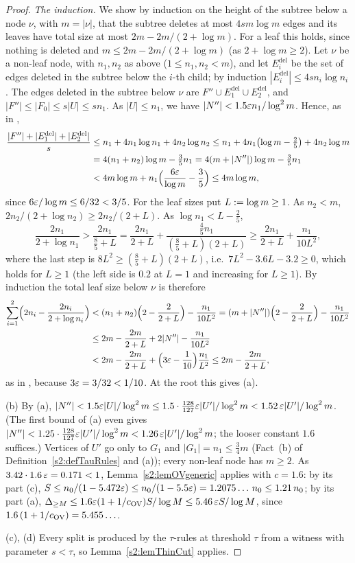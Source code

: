 \begin{proof}
\emph{The induction.} We show by induction on the height of the subtree below
a node $\nu$, with $m=|\nu|$, that the subtree deletes at most $4sm\log m$ edges
and its leaves have total size at most $2m-2m/(2+\log m)$. For a leaf this
holds, since nothing is deleted and $m\le2m-2m/(2+\log m)$ (as
$2+\log m\ge2$). Let $\nu$ be a non-leaf node, with $n_1,n_2$ as above
($1\le n_1,n_2<m$), and let $E^{\mathrm{del}}_i$ be the set of edges deleted in the subtree
below the $i$-th child; by induction $|E^{\mathrm{del}}_i|\le4sn_i\log n_i$. The edges
deleted in the subtree below $\nu$ are $F''\cup E^{\mathrm{del}}_1\cup E^{\mathrm{del}}_2$, and $|F''|\le
|F_0|\le s|U|\le sn_1$. As $|U|\le n_1$, we have $|N''|<1.5\varepsilon n_1/\log^2m$.
Hence, as in \cite[inequality~(8)]{BM},
\begin{align*}
\frac{|F''|+|E^{\mathrm{del}}_1|+|E^{\mathrm{del}}_2|}{s}
&\le n_1+4n_1\log n_1+4n_2\log n_2
\le n_1+4n_1\bigl(\log m-\tfrac25\bigr)+4n_2\log m\\
&=4(n_1+n_2)\log m-\tfrac35n_1=4(m+|N''|)\log m-\tfrac35n_1\\
&<4m\log m+n_1\Bigl(\frac{6\varepsilon}{\log m}-\frac35\Bigr)\le4m\log m,
\end{align*}
since $6\varepsilon/\log m\le6/32<3/5$. For the leaf sizes put $L\mathrel{:=}\log m\ge1$.
As $n_2<m$, $2n_2/(2+\log n_2)\ge2n_2/(2+L)$. As $\log n_1<L-\frac25$,
\[
\frac{2n_1}{2+\log n_1}>\frac{2n_1}{\frac85+L}=\frac{2n_1}{2+L}
+\frac{\frac45n_1}{(\frac85+L)(2+L)}\ge\frac{2n_1}{2+L}+\frac{n_1}{10L^2},
\]
where the last step is $8L^2\ge(\frac85+L)(2+L)$, i.e.\
$7L^2-3.6L-3.2\ge0$, which holds for $L\ge1$ (the left side is $0.2$ at
$L=1$ and increasing for $L\ge1$). By induction the total leaf size below
$\nu$ is therefore
\begin{align*}
\sum_{i=1}^2\Bigl(2n_i-\frac{2n_i}{2+\log n_i}\Bigr)
&<(n_1+n_2)\Bigl(2-\frac2{2+L}\Bigr)-\frac{n_1}{10L^2}
=(m+|N''|)\Bigl(2-\frac2{2+L}\Bigr)-\frac{n_1}{10L^2}\\
&\le2m-\frac{2m}{2+L}+2|N''|-\frac{n_1}{10L^2}\\
&<2m-\frac{2m}{2+L}+\Bigl(3\varepsilon-\frac1{10}\Bigr)\frac{n_1}{L^2}
\le2m-\frac{2m}{2+L},
\end{align*}
as in \cite[inequality~(9)]{BM}, because $3\varepsilon=3/32<1/10$. At the root this gives (a).

(b) By (a), $|N''|<1.5\varepsilon|U|/\log^2m\le1.5\cdot\frac{128}{127}\varepsilon|U'|/\log^2m
<1.52\,\varepsilon|U'|/\log^2m$. (The first bound of (a) even gives
$|N''|<1.25\cdot\frac{128}{127}\varepsilon|U'|/\log^2m<1.26\,\varepsilon|U'|/\log^2m$; the
looser constant $1.6$ suffices.) Vertices of $U'$ go only to $G_1$ and $|G_1|=n_1\le
\frac34m$ (Fact~(b) of Definition~\ref{s2:defTauRules} and (a)); every
non-leaf node has $m\ge2$. As $3.42\cdot1.6\,\varepsilon=0.171<1$,
Lemma~\ref{s2:lemOVgeneric} applies with $c=1.6$: by its part (c),
$S\le n_0/(1-5.472\varepsilon)\le n_0/(1-5.5\varepsilon)=1.2075\ldots\,n_0\le1.21\,n_0$; by its
part (a), $\Delta_{\ge M}\le1.6\varepsilon(1+1/c_{\mathrm{OV}})S/\log M\le5.46\,\varepsilon S/\log M$,
since $1.6\,(1+1/c_{\mathrm{OV}})=5.455\ldots$.

(c), (d) Every split is produced by the $\tau$-rules at threshold $\tau$ from a
witness with parameter $s<\tau$, so Lemma~\ref{s2:lemThinCut} applies.
\end{proof}

